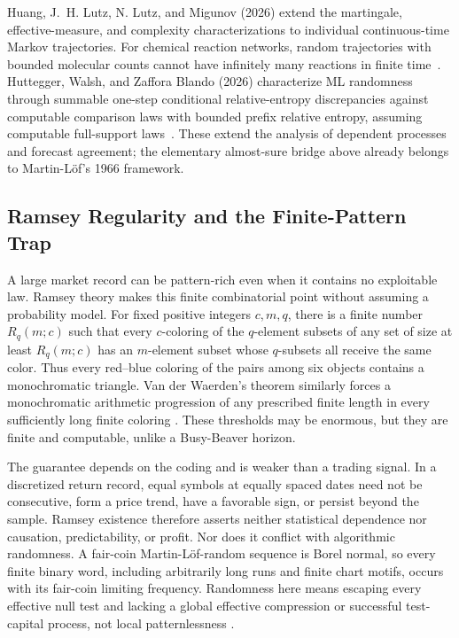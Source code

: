 \documentclass[aps,pra,reprint,superscriptaddress,amsmath,amssymb,floatfix]{revtex4-2}
\theoremstyle{plain}
\theoremstyle{definition}
\theoremstyle{remark}
\begin{document}
Huang, J.~H. Lutz, N. Lutz, and Migunov (2026) extend the martingale,
effective-measure, and complexity characterizations to individual
continuous-time Markov trajectories. For chemical reaction networks, random
trajectories with bounded molecular counts cannot have infinitely many
reactions in finite time~\cite{HuangLutzLutzMigunov2026}.
Huttegger, Walsh, and Zaffora Blando (2026) characterize ML randomness through
summable one-step conditional relative-entropy discrepancies against computable
comparison laws with bounded prefix relative entropy, assuming computable
full-support laws~\cite{HutteggerWalshZafforaBlando2026}.
These extend the analysis of dependent processes and forecast agreement;
the elementary almost-sure bridge above already belongs to Martin-L\"of's
1966 framework.

\subsection{Ramsey Regularity and the Finite-Pattern Trap}
\label{sec:ramseytrap}

A large market record can be pattern-rich even when it contains no exploitable
law. Ramsey theory makes this finite combinatorial point without assuming a
probability model. For fixed positive integers \(c,m,q\), there is a finite
number \(R_q(m;c)\) such that every \(c\)-coloring of the \(q\)-element subsets
of any set of size at least \(R_q(m;c)\) has an \(m\)-element subset whose
\(q\)-subsets all receive the same color. Thus every red--blue coloring of the
pairs among six objects contains a monochromatic triangle. Van der Waerden's
theorem similarly forces a monochromatic arithmetic progression of any
prescribed finite length in every sufficiently long finite coloring
\cite{Ramsey-GRS-90,GS-90}. These thresholds may be enormous, but they are
finite and computable, unlike a Busy-Beaver horizon.

The guarantee depends on the coding and is weaker than a trading signal. In a
discretized return record, equal symbols at equally spaced dates need not be
consecutive, form a price trend, have a favorable sign, or persist beyond the
sample. Ramsey existence therefore asserts neither statistical dependence nor
causation, predictability, or profit. Nor does it conflict with algorithmic
randomness. A fair-coin Martin-L\"of-random sequence is Borel normal, so every
finite binary word, including arbitrarily long runs and finite chart motifs,
occurs with its fair-coin limiting frequency. Randomness here means escaping
every effective null test and lacking a global effective compression or
successful test-capital process, not local patternlessness
\cite{calude:02,Nies2009}.
\end{document}
